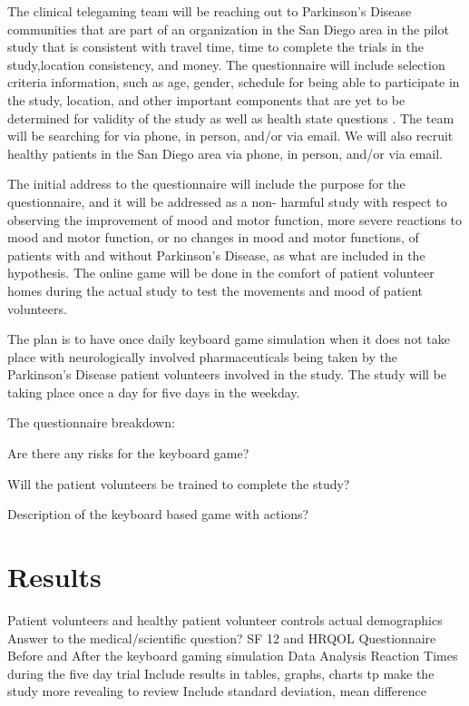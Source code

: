 \documentclass[12pt,letterpaper]{article}
\begin{document}
 The clinical telegaming team will be reaching out to Parkinson's Disease communities that are part of an organization in the San Diego area in the pilot study that is consistent with travel time, time to complete
 the trials in the study,location consistency, and money. The questionnaire will include selection criteria information, such as age, gender, schedule for being able to participate in the study, location, and other important components that are yet to be determined for validity of the study as well as health state questions \cite{Jenkinson2011}. The team will be searching for  via phone, in person, and/or via email. We will also recruit healthy patients in the San Diego area via phone, in person, and/or via email. 
 
 The initial address to the questionnaire will include the purpose for the questionnaire, and it will be addressed as a non- harmful study with respect to observing the improvement of mood and motor function, more severe reactions to mood and motor function, or no changes in mood and motor functions, of patients with and without Parkinson's Disease, as what are included in the hypothesis. The online game
 will be done in the comfort of patient volunteer homes during the actual study to test the movements and mood of patient volunteers. 
 
 The plan is to have once daily keyboard game simulation when it does not take place with neurologically involved pharmaceuticals being taken by the Parkinson's Disease patient volunteers involved in the study. The study will be taking place once a day for five days in the weekday. 
 
 The questionnaire breakdown:
 
 
 Are there any risks for the keyboard game?
 
 Will the patient volunteers be trained to complete the study?
 
 Description of the keyboard based game with actions?
 
\section{Results}
 Patient volunteers and healthy patient volunteer controls actual demographics
 Answer to the medical/scientific question?
 SF 12 and HRQOL Questionnaire Before and After the keyboard gaming simulation Data Analysis 
 Reaction Times during the five day trial
 Include results in tables, graphs, charts tp make the study more revealing to review
 Include standard deviation, mean difference
 
\end{document}
